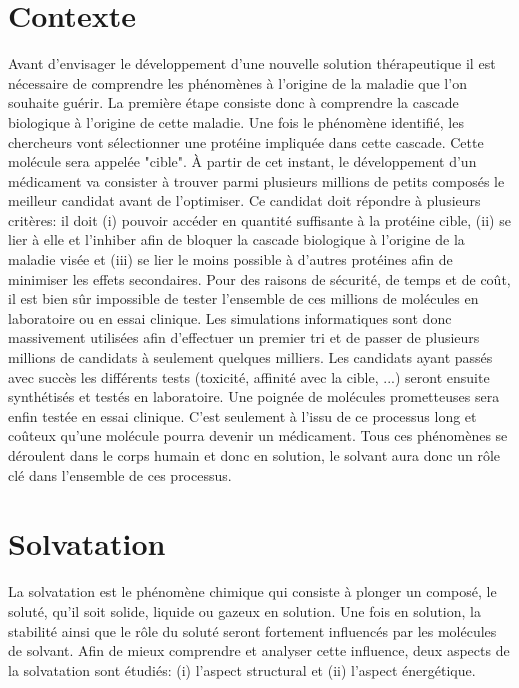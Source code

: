 \section{Contexte}
Avant d'envisager le développement d'une nouvelle solution thérapeutique il est nécessaire de comprendre les phénomènes à l'origine de la maladie que l'on souhaite guérir. La première étape consiste donc à comprendre la cascade biologique à l'origine de cette maladie. Une fois le phénomène identifié, les chercheurs vont sélectionner une protéine impliquée dans cette cascade. Cette molécule sera appelée "cible". À partir de cet instant, le développement d'un médicament va consister à trouver  parmi plusieurs millions de petits composés le meilleur candidat avant de l'optimiser. Ce candidat doit répondre à plusieurs critères: il doit (i) pouvoir accéder en quantité suffisante à la protéine cible, (ii) se lier à elle et l'inhiber afin de bloquer la cascade biologique à l'origine de la maladie visée et (iii) se lier le moins possible à d'autres protéines afin de minimiser les effets secondaires. Pour des raisons de sécurité, de temps et de coût, il est bien sûr impossible de tester l'ensemble de ces millions de molécules en laboratoire ou en essai clinique. Les simulations informatiques sont donc massivement utilisées afin d'effectuer un premier tri et de passer de plusieurs millions de candidats à seulement quelques milliers. Les candidats ayant passés avec succès les différents tests (toxicité, affinité avec la cible, ...) seront ensuite synthétisés et testés en laboratoire. Une poignée de molécules prometteuses sera enfin testée en essai clinique. C'est seulement à l'issu de ce processus long et coûteux qu'une molécule pourra devenir un médicament. Tous ces phénomènes se déroulent dans le corps humain et donc en solution, le solvant aura donc un rôle clé dans l'ensemble de ces processus.



\section{Solvatation}
La solvatation est le phénomène chimique qui consiste à plonger un composé, le soluté, qu'il soit solide, liquide ou gazeux en solution. Une fois en solution, la stabilité ainsi que le rôle du soluté seront fortement influencés par les molécules de solvant\cite{NickPace_protein_2004, levy_water_2004, Meyer_internal_1992, Ladbury_just_1996, GarcaSosa_hydration_2013, Lemieux_how_1996, Tame_role_1996, Li_effect_2005, Snyder_mechanism_2011, Wang_ligand_2011, Mobley_binding_2009, Barillari2007, Olano_hydration_2004, Bren_individual_2012, Ahmed_bound_2011, VAIANA_molecular_2006, Genheden_accurate_2011, Abel_contribution_2011, Biela_ligand_2012, Stegmann_thermodynamic_2009}. Afin de mieux comprendre et analyser cette influence, deux aspects de la solvatation sont étudiés: (i) l'aspect structural et (ii) l'aspect énergétique. 

